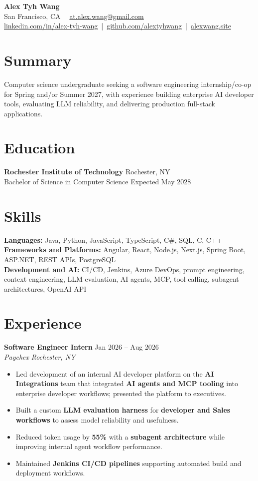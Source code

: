 \documentclass[10pt,letterpaper]{article}
\newif\ifresumeFirstRole
\newcommand{\resumeRole}[4]{%
  \ifresumeFirstRole
    \global\resumeFirstRolefalse
  \else
    \vspace{0pt plus 1fill}%
  \fi
  \textbf{#1} \hfill #2\\
  \textit{#3} \hfill \textit{#4}
}
\begin{document}
\begin{center}
{\Large \textbf{Alex Tyh Wang}}\\
San Francisco, CA \,|\, \href{mailto:at.alex.wang@gmail.com}{at.alex.wang@gmail.com}\\
\small \href{https://www.linkedin.com/in/alex-tyh-wang/}{linkedin.com/in/alex-tyh-wang} \,|\, \href{https://github.com/alextyhwang}{github.com/alextyhwang} \,|\, \href{https://alexwang.site}{alexwang.site}
\end{center}

\section*{Summary}
Computer science undergraduate seeking a software engineering internship/co-op for Spring and/or Summer 2027, with experience building enterprise AI developer tools, evaluating LLM reliability, and delivering production full-stack applications.

\section*{Education}
\textbf{Rochester Institute of Technology} \hfill Rochester, NY\\
Bachelor of Science in Computer Science \hfill Expected May 2028

\section*{Skills}
\textbf{Languages:} Java, Python, JavaScript, TypeScript, C\#, SQL, C, C++\\
\textbf{Frameworks and Platforms:} Angular, React, Node.js, Next.js, Spring Boot, ASP.NET, REST APIs, PostgreSQL\\
\textbf{Development and AI:} CI/CD, Jenkins, Azure DevOps, prompt engineering, context engineering, LLM evaluation, AI agents, MCP, tool calling, subagent architectures, OpenAI API

\section*{Experience}
\resumeRole{Software Engineer Intern}{Jan 2026 -- Aug 2026}{Paychex}{Rochester, NY}
\begin{itemize}
  \item Led development of an internal AI developer platform on the \textbf{AI Integrations} team that integrated \textbf{AI agents and MCP tooling} into enterprise developer workflows; presented the platform to executives.
  \item Built a custom \textbf{LLM evaluation harness} for \textbf{developer and Sales workflows} to assess model reliability and usefulness.
  \item Reduced token usage by \textbf{55\%} with a \textbf{subagent architecture} while improving internal agent workflow performance.
  \item Maintained \textbf{Jenkins CI/CD pipelines} supporting automated build and deployment workflows.
\end{itemize}
\end{document}
